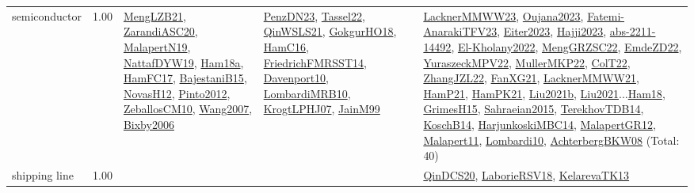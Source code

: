 {\begin{longtable}{p{3cm}r>{\raggedright\arraybackslash}p{6cm}>{\raggedright\arraybackslash}p{6cm}>{\raggedright\arraybackslash}p{8cm}}
\index{semiconductor}\index{ApplicationAreas!semiconductor}semiconductor &  1.00 & \hyperref[detail:MengLZB21]{MengLZB21}, \hyperref[detail:ZarandiASC20]{ZarandiASC20}, \hyperref[detail:MalapertN19]{MalapertN19}, \hyperref[detail:NattafDYW19]{NattafDYW19}, \hyperref[detail:Ham18a]{Ham18a}, \hyperref[detail:HamFC17]{HamFC17}, \hyperref[detail:BajestaniB15]{BajestaniB15}, \hyperref[detail:NovasH12]{NovasH12}, \hyperref[detail:Pinto2012]{Pinto2012}, \hyperref[detail:ZeballosCM10]{ZeballosCM10}, \hyperref[detail:Wang2007]{Wang2007}, \hyperref[detail:Bixby2006]{Bixby2006} & \hyperref[detail:PenzDN23]{PenzDN23}, \hyperref[detail:Tassel22]{Tassel22}, \hyperref[detail:QinWSLS21]{QinWSLS21}, \hyperref[detail:GokgurHO18]{GokgurHO18}, \hyperref[detail:HamC16]{HamC16}, \hyperref[detail:FriedrichFMRSST14]{FriedrichFMRSST14}, \hyperref[detail:Davenport10]{Davenport10}, \hyperref[detail:LombardiMRB10]{LombardiMRB10}, \hyperref[detail:KrogtLPHJ07]{KrogtLPHJ07}, \hyperref[detail:JainM99]{JainM99} & \hyperref[detail:LacknerMMWW23]{LacknerMMWW23}, \hyperref[detail:Oujana2023]{Oujana2023}, \hyperref[detail:Fatemi-AnarakiTFV23]{Fatemi-AnarakiTFV23}, \hyperref[detail:Eiter2023]{Eiter2023}, \hyperref[detail:Hajji2023]{Hajji2023}, \hyperref[detail:abs-2211-14492]{abs-2211-14492}, \hyperref[detail:El-Kholany2022]{El-Kholany2022}, \hyperref[detail:MengGRZSC22]{MengGRZSC22}, \hyperref[detail:EmdeZD22]{EmdeZD22}, \hyperref[detail:YuraszeckMPV22]{YuraszeckMPV22}, \hyperref[detail:MullerMKP22]{MullerMKP22}, \hyperref[detail:ColT22]{ColT22}, \hyperref[detail:ZhangJZL22]{ZhangJZL22}, \hyperref[detail:FanXG21]{FanXG21}, \hyperref[detail:LacknerMMWW21]{LacknerMMWW21}, \hyperref[detail:HamP21]{HamP21}, \hyperref[detail:HamPK21]{HamPK21}, \hyperref[detail:Liu2021b]{Liu2021b}, \hyperref[detail:Liu2021]{Liu2021}...\hyperref[detail:Ham18]{Ham18}, \hyperref[detail:GrimesH15]{GrimesH15}, \hyperref[detail:Sahraeian2015]{Sahraeian2015}, \hyperref[detail:TerekhovTDB14]{TerekhovTDB14}, \hyperref[detail:KoschB14]{KoschB14}, \hyperref[detail:HarjunkoskiMBC14]{HarjunkoskiMBC14}, \hyperref[detail:MalapertGR12]{MalapertGR12}, \hyperref[detail:Malapert11]{Malapert11}, \hyperref[detail:Lombardi10]{Lombardi10}, \hyperref[detail:AchterbergBKW08]{AchterbergBKW08} (Total: 40)\\
\index{shipping line}\index{ApplicationAreas!shipping line}shipping line &  1.00 &  &  & \hyperref[detail:QinDCS20]{QinDCS20}, \hyperref[detail:LaborieRSV18]{LaborieRSV18}, \hyperref[detail:KelarevaTK13]{KelarevaTK13}\\

\end{longtable}}
